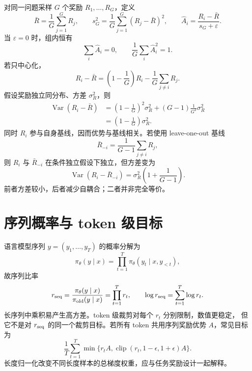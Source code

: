 \documentclass[11pt]{article}
\numberwithin{equation}{section}
\newcommand{\1}{\mathbf{1}}
\newcommand{\Var}{\operatorname{Var}}
\begin{document}
对同一问题采样 $G$ 个奖励 $R_1,\ldots,R_G$，定义
\begin{equation}
 \bar R=\frac1G\sum_{j=1}^{G}R_j,\qquad
 s_G^2=\frac1G\sum_{j=1}^{G}(R_j-\bar R)^2,\qquad
 \widehat A_i=\frac{R_i-\bar R}{s_G+\varepsilon}.
\end{equation}
当 $\varepsilon=0$ 时，组内恒有
\begin{equation}
 \sum_i\widehat A_i=0,\qquad
 \frac1G\sum_i\widehat A_i^2=1.
\end{equation}
若只中心化，
\begin{equation}
 R_i-\bar R=\left(1-\frac1G\right)R_i
 -\frac1G\sum_{j\ne i}R_j.
\end{equation}
假设奖励独立同分布、方差 $\sigma_R^2$，则
\begin{align}
 \Var(R_i-\bar R)
 &=\left(1-\frac1G\right)^2\sigma_R^2
 +(G-1)\frac1{G^2}\sigma_R^2\\
 &=\left(1-\frac1G\right)\sigma_R^2.
\end{align}
同时 $R_i$ 参与自身基线，因而优势与基线相关。若使用 leave-one-out 基线
\begin{equation}
 \bar R_{-i}=\frac1{G-1}\sum_{j\ne i}R_j,
\end{equation}
则 $R_i$ 与 $\bar R_{-i}$ 在条件独立假设下独立，但方差变为
\begin{equation}
 \Var(R_i-\bar R_{-i})=\sigma_R^2\left(1+\frac1{G-1}\right).
\end{equation}
前者方差较小，后者减少自耦合；二者并非完全等价。

\section{序列概率与 token 级目标}

语言模型序列 $y=(y_1,\ldots,y_T)$ 的概率分解为
\begin{equation}
 \pi_\theta(y\mid x)=\prod_{t=1}^{T}\pi_\theta(y_t\mid x,y_{<t}),
\end{equation}
故序列比率
\begin{equation}
 r_{\rm seq}=\frac{\pi_\theta(y\mid x)}{\pi_{\rm old}(y\mid x)}
 =\prod_{t=1}^{T}r_t,\qquad
 \log r_{\rm seq}=\sum_{t=1}^{T}\log r_t.
\end{equation}
长序列中乘积易产生高方差。token 级裁剪对每个 $r_t$ 分别限制，数值更稳定，
但它不是对 $r_{\rm seq}$ 的同一个裁剪目标。若所有 token 共用序列奖励优势 $A$，常见目标为
\begin{equation}
 \frac1T\sum_{t=1}^{T}
 \min\{r_tA,\operatorname{clip}(r_t,1-\epsilon,1+\epsilon)A\}.
\end{equation}
长度归一化改变不同长度样本的总梯度权重，应与任务奖励设计一起解释。
\end{document}
